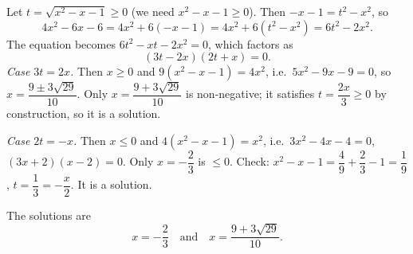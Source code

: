 Let $t=\sqrt{x^2-x-1}\ge0$ (we need $x^2-x-1\ge0$). Then $-x-1=t^2-x^2$, so
\[
4x^2-6x-6=4x^2+6(-x-1)=4x^2+6(t^2-x^2)=6t^2-2x^2 .
\]
The equation becomes $6t^2-xt-2x^2=0$, which factors as
\[
(3t-2x)(2t+x)=0 .
\]
\emph{Case $3t=2x$.} Then $x\ge0$ and $9(x^2-x-1)=4x^2$, i.e.\ $5x^2-9x-9=0$, so $x=\dfrac{9\pm3\sqrt{29}}{10}$. Only $x=\dfrac{9+3\sqrt{29}}{10}$ is non-negative; it satisfies $t=\dfrac{2x}{3}\ge0$ by construction, so it is a solution.

\emph{Case $2t=-x$.} Then $x\le0$ and $4(x^2-x-1)=x^2$, i.e.\ $3x^2-4x-4=0$, $(3x+2)(x-2)=0$. Only $x=-\dfrac{2}{3}$ is $\le0$. Check: $x^2-x-1=\dfrac{4}{9}+\dfrac{2}{3}-1=\dfrac{1}{9}$, $t=\dfrac{1}{3}=-\dfrac {x}{2}$. It is a solution.

The solutions are
\[
\boxed{x=-\dfrac{2}{3}\quad\text{and}\quad x=\dfrac{9+3\sqrt{29}}{10}}.
\]
